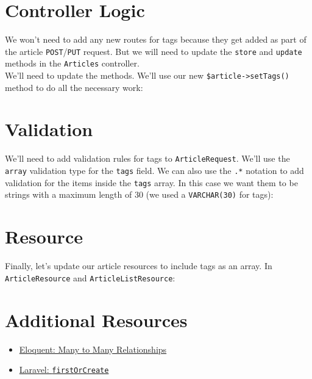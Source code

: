 \section{Controller Logic}

We won't need to add any new routes for tags because they get added as part of the article \texttt{POST}/\texttt{PUT} request. But we will need to update the \texttt{store} and \texttt{update} methods in the \texttt{Articles} controller.
\\

We'll need to update the methods. We'll use our new \texttt{\$article->setTags()} method to do all the necessary work:



\section{Validation}

We'll need to add validation rules for tags to \texttt{ArticleRequest}. We'll use the \texttt{array} validation type for the \texttt{tags} field. We can also use the \texttt{.*} notation to add validation for the items inside the \texttt{tags} array. In this case we want them to be strings with a maximum length of 30 (we used a \texttt{VARCHAR(30)} for tags):



\section{Resource}

Finally, let's update our article resources to include tags as an array. In \texttt{ArticleResource} and \texttt{ArticleListResource}:




\section{Additional Resources}

\begin{itemize}[leftmargin=*]
    \item \href{http://laravel.com/docs/master/eloquent-relationships#many-to-many}{Eloquent: Many to Many Relationships}
    \item \href{http://laravel.com/docs/master/eloquent#other-creation-methods}{Laravel: \texttt{firstOrCreate}}
\end{itemize}

